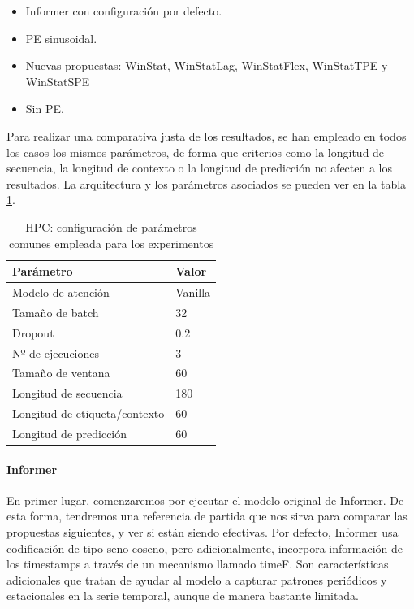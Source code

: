 \begin{itemize}
	\item Informer con configuración por defecto.
	\item PE sinusoidal.
	\item Nuevas propuestas: WinStat, WinStatLag, WinStatFlex,  WinStatTPE y WinStatSPE	
	\item Sin PE.
\end{itemize}

Para realizar una comparativa justa de los resultados, se han empleado en todos los casos los mismos parámetros, de forma que criterios como la longitud de secuencia, la longitud de contexto o la longitud de predicción no afecten a los resultados. La arquitectura y los parámetros asociados se pueden ver en la tabla \ref{ajustes}.

\begin{table}[!ht]
	\centering
	\begin{tabular}{l|l}
		\toprule
		Parámetro & Valor \\
		\midrule
		{Modelo de atención} & Vanilla \\
		{Tamaño de batch} & 32 \\
		{Dropout} & 0.2 \\
		{Nº de ejecuciones} & 3 \\
		{Tamaño de ventana} & 60 \\
		{Longitud de secuencia} & 180 \\
		{Longitud de etiqueta/contexto} & 60 \\
		{Longitud de predicción} & 60 \\
		\bottomrule
	\end{tabular}
\caption{HPC: configuración de parámetros comunes empleada para los experimentos}
\label{ajustes}
\end{table}

\paragraph{Informer}

En primer lugar, comenzaremos por ejecutar el modelo original de Informer. De esta forma, tendremos una referencia de partida que nos sirva para comparar las propuestas siguientes, y ver si están siendo efectivas. Por defecto, Informer usa codificación de tipo seno-coseno, pero adicionalmente, incorpora información de los timestamps a través de un mecanismo llamado timeF. Son características adicionales que tratan de ayudar al modelo a capturar patrones periódicos y estacionales en la serie temporal, aunque de manera bastante limitada. 


